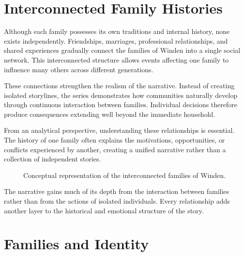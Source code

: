 \documentclass[12pt,oneside,openany]{book}
\begin{document}
\section{Interconnected Family Histories}

Although each family possesses its own traditions and internal history, none
exists independently. Friendships, marriages, professional relationships, and
shared experiences gradually connect the families of Winden into a single
social network. This interconnected structure allows events affecting one
family to influence many others across different generations.

These connections strengthen the realism of the narrative. Instead of creating
isolated storylines, the series demonstrates how communities naturally develop
through continuous interaction between families. Individual decisions therefore
produce consequences extending well beyond the immediate household.

From an analytical perspective, understanding these relationships is essential.
The history of one family often explains the motivations, opportunities, or
conflicts experienced by another, creating a unified narrative rather than a
collection of independent stories.

\begin{figure}[H]
\centering
{}
\caption{Conceptual representation of the interconnected families of Winden.}
\end{figure}

\begin{tcolorbox}[colback=blue!5,colframe=blue!60!black,title=Analysis]
The narrative gains much of its depth from the interaction between families
rather than from the actions of isolated individuals. Every relationship adds
another layer to the historical and emotional structure of the story.
\end{tcolorbox}
\section{Families and Identity}
\end{document}
